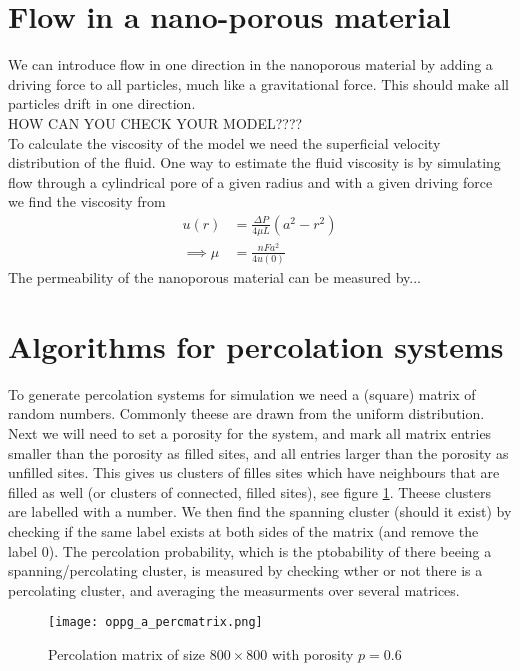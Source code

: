 \documentclass[a4paper,english, 10pt, twoside]{article}
\begin{document}
\section{Flow in a nano-porous material}
We can introduce flow in one direction in the nanoporous material by adding a driving force to all particles, much like a gravitational force.
This should make all particles drift in one direction.\\
HOW CAN YOU CHECK YOUR MODEL????\\
To calculate the viscosity of the model we need the superficial velocity distribution of the fluid. One way to estimate the fluid viscosity is 
by simulating flow through a cylindrical pore of a given radius and with a given driving force we find the viscosity from
\begin{align*}
 u(r) &= \frac{\Delta P}{4\mu L}\left(a^2-r^2\right)\\
 \implies \mu &= \frac{nFa^2}{4u(0)}
\end{align*}
The permeability of the nanoporous material can be measured by...

\section{Algorithms for percolation systems}
To generate percolation systems for simulation we need a (square) matrix of random numbers. Commonly theese are drawn from the 
uniform distribution. Next we will need to set a porosity for the system, and mark all matrix entries smaller than the porosity 
as filled sites, and all entries larger than the porosity as unfilled sites. This gives us clusters of filles sites which have 
neighbours that are filled as well (or clusters of connected, filled sites), see figure \ref{perc_matrix}. Theese clusters are labelled with a number.
We then find the spanning cluster (should it exist) by checking if the same label exists at both sides of the matrix (and remove the label 0). 
The percolation probability, which is the ptobability of there beeing a spanning/percolating cluster, is measured by checking wther or not there is 
a percolating cluster, and averaging the measurments over several matrices.

\begin{figure}[H]
\centering
\texttt{[image: oppg\_a\_percmatrix.png]}
\caption{Percolation matrix of size $800\times800$ with porosity $p=0.6$}
\label{perc_matrix}
\end{figure}
\end{document}
